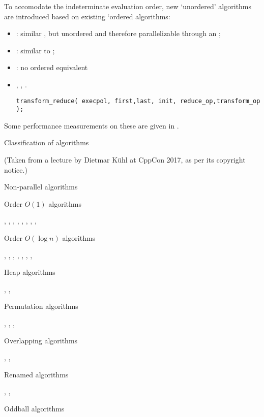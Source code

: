 To accomodate the indeterminate evaluation order, new
`unordered' algorithms are introduced based on
existing `ordered algorithms:
\begin{itemize}
\item {}: similar , but unordered
  and therefore parallelizable through an ;
\item {}: similar to ;
\item {}: no ordered equivalent
\item {}, , .
\begin{lstlisting}
transform_reduce( execpol, first,last, init, reduce_op,transform_op );
\end{lstlisting}
\end{itemize}

Some performance measurements on these are given in
.

 {Classification of algorithms}

(Taken from a lecture by Dietmar K\"uhl at CppCon 2017, as per its copyright notice.)

 {Non-parallel algorithms}

 {Order $O(1)$ algorithms}

,
,
,
,
,
,
,
,

 {Order $O(\log n)$ algorithms}

,
,
,
,
,
,
,

 {Heap algorithms}

,
,

 {Permutation algorithms}

,
,
,

 {Overlapping algorithms}

,
,

 {Renamed algorithms}

,
,

 {Oddball algorithms}

